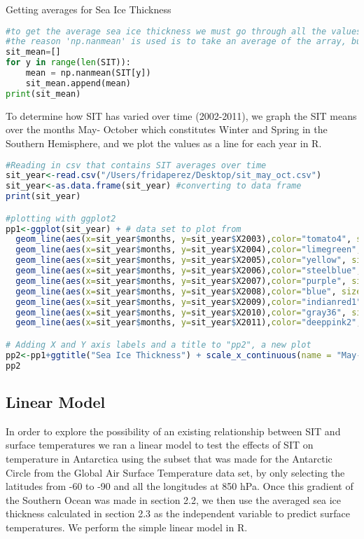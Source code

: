 \documentclass{article}
\begin{document}
Getting averages for Sea Ice Thickness
\begin{lstlisting}[language=Python]
#to get the average sea ice thickness we must go through all the values and do so with a for loop
#the reason 'np.nanmean' is used is to take an average of the array, but because values do not exist for every lat and lon for the array
sit_mean=[]
for y in range(len(SIT)):
    mean = np.nanmean(SIT[y])
    sit_mean.append(mean)
print(sit_mean)
\end{lstlisting}

To determine how SIT has varied over time (2002-2011), we graph the SIT means over the months May- October which constitutes Winter and Spring in the Southern Hemisphere, and we plot the values as a line for each year in R.

\begin{lstlisting}[language=R]
#Reading in csv that contains SIT averages over time
sit_year<-read.csv("/Users/fridaperez/Desktop/sit_may_oct.csv")
sit_year<-as.data.frame(sit_year) #converting to data frame
print(sit_year)

#plotting with ggplot2
pp1<-ggplot(sit_year) + # data set to plot from 
  geom_line(aes(x=sit_year$months, y=sit_year$X2003),color="tomato4", size=1)+ # plotting as a line all monthly values for specified year
  geom_line(aes(x=sit_year$months, y=sit_year$X2004),color="limegreen", size=1)+
  geom_line(aes(x=sit_year$months, y=sit_year$X2005),color="yellow", size=1)+
  geom_line(aes(x=sit_year$months, y=sit_year$X2006),color="steelblue", size=1)+
  geom_line(aes(x=sit_year$months, y=sit_year$X2007),color="purple", size=1)+
  geom_line(aes(x=sit_year$months, y=sit_year$X2008),color="blue", size=1)+
  geom_line(aes(x=sit_year$months, y=sit_year$X2009),color="indianred1", size=1)+
  geom_line(aes(x=sit_year$months, y=sit_year$X2010),color="gray36", size=1)+
  geom_line(aes(x=sit_year$months, y=sit_year$X2011),color="deeppink2", size=1)

# Adding X and Y axis labels and a title to "pp2", a new plot 
pp2<-pp1+ggtitle("Sea Ice Thickness") + scale_x_continuous(name = "May-October") + scale_y_continuous(name = "Sea Ice Thickness (in m)") 
pp2
\end{lstlisting}{}

\subsection{Linear Model}
In order to explore the possibility of an existing relationship between SIT and surface temperatures we ran a linear model to test the effects of SIT on temperature in Antarctica using the subset that was made for the Antarctic Circle from the Global Air Surface Temperature data set, by only selecting the latitudes from -60 to -90 and all the longitudes at 850 hPa. Once this gradient of the Southern Ocean was made in section 2.2, we then use the averaged sea ice thickness calculated in section 2.3 as the independent variable to predict surface temperatures. We perform the simple linear model in R. 
\end{document}

